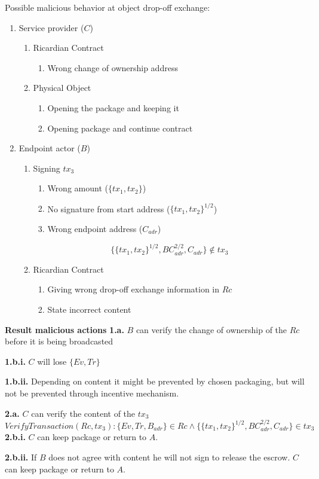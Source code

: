Possible malicious behavior at object drop-off exchange:
\begin{enumerate}
  \item Service provider ($C$)
  \begin{enumerate}
    \item Ricardian Contract
    \begin{enumerate}
      \item Wrong change of ownership address
    \end{enumerate}
    \item Physical Object
    \begin{enumerate}
      \item Opening the package and keeping it
      \item Opening package and continue contract
    \end{enumerate}
  \end{enumerate}
  \item Endpoint actor ($B$)
  \begin{enumerate}
    \item Signing $tx_3$
    \begin{enumerate}
      \item Wrong amount ($\{tx_1, tx_2\}$)
      \item No signature from start address ($\{tx_1, tx_2\}^{1/2}$)
      \item Wrong endpoint address ($C_{adr}$)
    \end{enumerate}
    \[\{\{tx_1, tx_2\}^{1/2}, BC_{adr}^{2/2}, C_{adr}\}\not\in tx_3\]
    \item Ricardian Contract
    \begin{enumerate}
      \item Giving wrong drop-off exchange information in $Rc$
      \item State incorrect content
    \end{enumerate}
  \end{enumerate}
\end{enumerate}

\bigbreak
\noindent\textbf{Result malicious actions}
\bigbreak
\noindent\textbf{1.a.} $B$ can verify the change of ownership of the $Rc$ before it is being broadcasted \par
\noindent\textbf{1.b.i.} $C$ will lose $\{Ev, Tr\}$ \par
\noindent\textbf{1.b.ii.} Depending on content it might be prevented by chosen packaging, but will not be prevented through incentive mechanism. \par

\noindent\textbf{2.a.} $C$ can verify the content of the $tx_3$
\[VerifyTransaction(Rc, tx_3)\colon\{Ev, Tr, B_{adr}\} \in Rc \land \{\{tx_1, tx_2\}^{1/2}, BC_{adr}^{2/2}, C_{adr}\} \in tx_3\]
\noindent\textbf{2.b.i.} $C$ can keep package or return to $A$.\par
\noindent\textbf{2.b.ii.} If $B$ does not agree with content he will not sign to release the escrow. $C$ can keep package or return to $A$.\par

